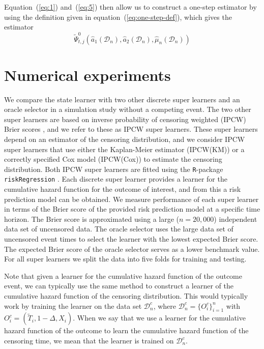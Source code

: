 \documentclass[a4,danish]{article}
\newcommand{\data}{\ensuremath{\mathcal{D}}}
\begin{document}
Equation~(\ref{eq:1}) and~(\ref{eq:5}) then allow us to construct a one-step
estimator by using the definition given in equation~(\ref{eq:one-step-def}),
which gives the estimator
\begin{equation}
  \label{eq:one-step-comp-ate}
  \tilde{\Psi}_{t, j}^0(\hat{a}_1(\data_n), \hat{a}_2(\data_n), \hat{\mu}_n(\data_n))
\end{equation}


\section{Numerical experiments}
\label{sec:numer-exper}

We compare the state learner with two other discrete super learners and an
oracle selector in a simulation study without a competing event. The two other
super learners are based on inverse probability of censoring weighted (IPCW)
Brier scores \citep{graf1999assessment,gerds2006consistent}, and we refer to
these as IPCW super learners. These super learners depend on an estimator of the
censoring distribution, and we consider IPCW super learners that use either the
Kaplan-Meier estimator (IPCW(KM)) or a correctly specified Cox model (IPCW(Cox))
to estimate the censoring distribution. Both IPCW super learners are fitted
using the \texttt{R}-package \texttt{riskRegression}
\citep{Gerds_Ohlendorff_Ozenne_2023}. Each discrete super learner provides a
learner for the cumulative hazard function for the outcome of interest, and from
this a risk prediction model can be obtained. We measure performance of each
super learner in terms of the Brier score of the provided risk prediction model
at a specific time horizon. The Brier score is approximated using a large
(\( n = 20,000 \)) independent data set of uncensored data. The oracle selector
uses the large data set of uncensored event times to select the learner with the
lowest expected Brier score. The expected Brier score of the oracle selector
serves as a lower benchmark value. For all super learners we split the data into
five folds for training and testing.

Note that given a learner for the cumulative hazard function of the
outcome event, we can typically use the same method to construct a
learner of the cumulative hazard function of the censoring
distribution. This would typically work by training the learner on the
data set \( \data_n^c \), where \( \data_n^c = \{O_i^c\}_{i=1}^n \)
with \( O_i^c = (\tilde{T}_i, 1-\Delta, X_i) \). When we say that we
use a learner for the cumulative hazard function of the outcome to
learn the cumulative hazard function of the censoring time, we mean
that the learner is trained on \( \data_n^c \).
\end{document}
